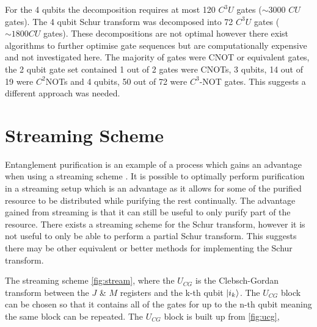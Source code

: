 \documentclass[12pt]{article}
\begin{document}
For the 4 qubits the decomposition requires at most 120 $C^3U$ gates ($\sim 3000$ $CU$ gates). The 4 qubit Schur transform was decomposed into 72 $C^3U$ gates ($\sim 1800 CU$ gates). These decompositions are not optimal however there exist algorithms to further optimise gate sequences \cite{shende2006synthesis} but are computationally expensive and not investigated here. The majority of gates were CNOT or equivalent gates, the 2 qubit gate set contained 1 out of 2 gates were CNOTs, 3 qubits, 14 out of 19 were $C^2$NOTs and 4 qubits, 50 out of 72 were $C^3$-NOT gates. This suggests a different approach was needed.

\section{Streaming Scheme}

Entanglement purification is an example of a process which gains an advantage when using a streaming scheme \cite{blume2014streaming}. It is possible to optimally perform purification in a streaming setup which is an advantage as it allows for some of the purified resource to be distributed while purifying the rest continually. The advantage gained from streaming is that it can still be useful to only purify part of the resource. There exists a streaming scheme for the Schur transform, however it is not useful to only be able to  perform a partial Schur transform. This suggests there may be other equivalent or better methods for implementing the Schur transform.      

The streaming scheme \autoref{fig:stream}, where the $U_{CG}$ is the Clebsch-Gordan transform between the $J$ \& $M$ registers and the k-th qubit $\left\vert{i_k}\right\rangle$. The $U_{CG}$ block can be chosen so that it contains all of the gates for up to the n-th qubit meaning the same block can be repeated. The $U_{CG}$ block is built up from \autoref{fig:ucg},  
\end{document}
